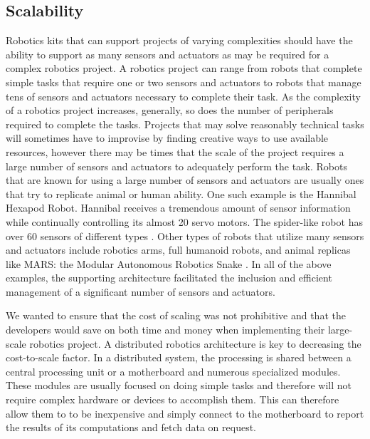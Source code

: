 

\subsection{Scalability} %
\label{sub:scalability}
Robotics kits that can support projects of varying complexities should have the ability to support as many sensors and actuators as may be required for a complex robotics project. A robotics project can range from robots that complete simple tasks that require one or two sensors and actuators to robots that manage tens of sensors and actuators necessary to complete their task. As the complexity of a robotics project increases, generally, so does the number of peripherals required to complete the tasks. Projects that may solve reasonably technical tasks will sometimes have to improvise by finding creative ways to use available resources, however there may be times that the scale of the project requires a large number of sensors and actuators to adequately perform the task. Robots that are known for using a large number of sensors and actuators are usually ones that try to replicate animal or human ability. One such example is the Hannibal Hexapod Robot. Hannibal receives a tremendous amount of sensor  information while continually controlling its almost 20 servo motors.  The spider-like robot has over 60 sensors of different types \parencite{hannibal}. Other types of robots that utilize many sensors and actuators include robotics arms, full humanoid robots, and animal replicas like MARS: the Modular  Autonomous Robotics Snake \parencite{mars}. In all of the above examples, the supporting architecture facilitated the inclusion and efficient management of a significant number of sensors and actuators.

 We wanted to ensure that the cost of scaling was not prohibitive and that the developers would save on both time and money when implementing their large-scale robotics project. A distributed robotics architecture is key to decreasing the cost-to-scale factor. In a distributed system, the processing is shared between a central processing unit or a motherboard and numerous specialized modules. These modules are usually focused on doing simple tasks and therefore will not require complex hardware or devices to accomplish them. This can therefore allow them to to be inexpensive and simply connect to the motherboard to report the results of its computations and fetch data on request.


